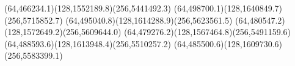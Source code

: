 {(64,466234.1)(128,1552189.8)(256,5441492.3)}
{(64,498700.1)(128,1640849.7)(256,5715852.7)}
{(64,495040.8)(128,1614288.9)(256,5623561.5)}
{(64,480547.2)(128,1572649.2)(256,5609644.0)}
{(64,479276.2)(128,1567464.8)(256,5491159.6)}
{(64,488593.6)(128,1613948.4)(256,5510257.2)}
{(64,485500.6)(128,1609730.6)(256,5583399.1)}
